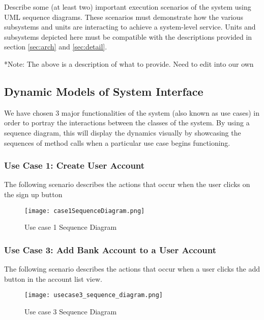 \documentclass[12pt]{article}
\begin{document}
Describe some (at least two) important execution scenarios of the system using UML sequence diagrams.
These scenarios must demonstrate how the various subsystems and units are interacting to achieve a system-level service.
Units and subsystems depicted here must be compatible with the descriptions provided in
section \ref{sec:arch} and \ref{sec:detail}.

*Note: The above is a description of what to provide. Need to edit into our own


\subsection{Dynamic Models of System Interface}

We have chosen 3 major functionalities of the system (also known as use cases) in order to portray the interactions between the classes of the system. By using a sequence diagram, this will display the dynamics visually by showcasing the sequences of method calls when a particular use case begins functioning.

\clearpage

\subsubsection{Use Case 1: Create User Account}

The following scenario describes the actions that occur when the user clicks on the sign up button

\begin{figure}[H]
\texttt{[image: case1SequenceDiagram.png]}
\caption{Use case 1 Sequence Diagram}
\label{fig:use-case-1-sequence-diagram}
\end{figure}

\clearpage

\subsubsection{Use Case 3: Add Bank Account to a User Account}

The following scenario describes the actions that occur when a user clicks the add button in the account list view.

\begin{figure}[H]
\texttt{[image: usecase3\_sequence\_diagram.png]}
\caption{Use case 3 Sequence Diagram}
\label{fig:use-case-3-sequence-diagram}
\end{figure}
\end{document}
